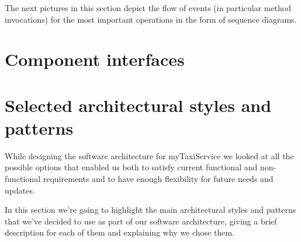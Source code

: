 The next pictures in this section depict the flow of events (in particular method invocations) for the most important operations in the form of sequence diagrams. 
\begin{landscape}

\end{landscape}


\section{Component interfaces}

\section{Selected architectural styles and patterns}
While designing the software architecture for myTaxiService we looked at all the possible options that enabled us both to satisfy current functional and non-functional requirements and to have enough flexibility for future needs and updates.

In this section we're going to highlight the main architectural styles and patterns that we've decided to use as part of our software architecture, giving a brief description for each of them and explaining why we chose them.

